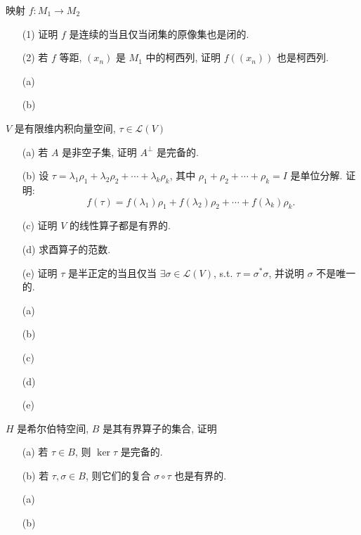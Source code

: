\documentclass{assignment}
\begin{document}
\begin{prob}
    映射 $f:M_1\rightarrow M_2$
    \begin{itemize}
        \item[(1)] 证明 $f$ 是连续的当且仅当闭集的原像集也是闭的.
        \item[(2)] 若 $f$ 等距, $(x_n)$ 是 $M_1$ 中的柯西列, 证明 $f((x_n))$ 也是柯西列.
    \end{itemize}
\end{prob}
\begin{sol}
    \begin{itemize}
        \item[(a)] 
        \item[(b)] 
    \end{itemize}
\end{sol}

\begin{prob}
    $V$ 是有限维内积向量空间, $\tau\in\mathcal{L}(V)$
    \begin{itemize}
        \item[(a)] 若 $A$ 是非空子集, 证明 $A^{\perp}$ 是完备的.
        \item[(b)] 设 $\tau=\lambda_1\rho_1+\lambda_2\rho_2+\cdots+\lambda_k\rho_k$, 其中 $\rho_1+\rho_2+\cdots+\rho_k=I$ 是单位分解. 证明:
        \[
            f(\tau)=f(\lambda_1)\rho_1+f(\lambda_2)\rho_2+\cdots+f(\lambda_k)\rho_k.
        \]
        \item[(c)] 证明 $V$ 的线性算子都是有界的.
        \item[(d)] 求酉算子的范数.
        \item[(e)] 证明 $\tau$ 是半正定的当且仅当 $\exists\sigma\in\mathcal{L}(V)$, s.t. $\tau=\sigma^*\sigma$, 并说明 $\sigma$ 不是唯一的.
    \end{itemize}
\end{prob}
\begin{sol}
    \begin{itemize}
        \item[(a)] 
        \item[(b)] 
        \item[(c)] 
        \item[(d)] 
        \item[(e)] 
    \end{itemize}
\end{sol}

\begin{prob}
    $H$ 是希尔伯特空间, $B$ 是其有界算子的集合, 证明
    \begin{itemize}
        \item[(a)] 若 $\tau\in B$, 则 $\ker\tau$ 是完备的.
        \item[(b)] 若 $\tau,\sigma\in B$, 则它们的复合 $\sigma\circ\tau$ 也是有界的.
    \end{itemize}
\end{prob}
\begin{pf}
    \begin{itemize}
        \item[(a)] 
        \item[(b)] 
    \end{itemize}
\end{pf}
\end{document}
